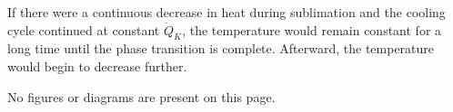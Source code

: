 If there were a continuous decrease in heat during sublimation and the cooling cycle continued at constant \( \dot{Q}_K \), the temperature would remain constant for a long time until the phase transition is complete. Afterward, the temperature would begin to decrease further.  

No figures or diagrams are present on this page.